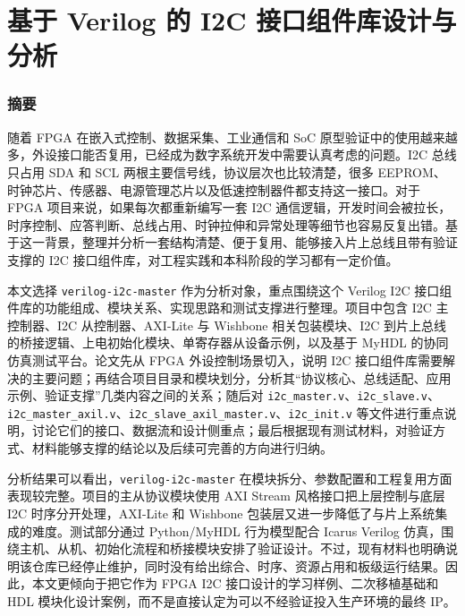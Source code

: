 \section{基于 Verilog 的 I2C 接口组件库设计与分析}\label{ux57faux4e8e-verilog-ux7684-i2c-ux63a5ux53e3ux7ec4ux4ef6ux5e93ux8bbeux8ba1ux4e0eux5206ux6790}

\subsubsection{摘要}\label{ux6458ux8981}

随着 FPGA 在嵌入式控制、数据采集、工业通信和 SoC 原型验证中的使用越来越多，外设接口能否复用，已经成为数字系统开发中需要认真考虑的问题。I2C 总线只占用 SDA 和 SCL 两根主要信号线，协议层次也比较清楚，很多 EEPROM、时钟芯片、传感器、电源管理芯片以及低速控制器件都支持这一接口。对于 FPGA 项目来说，如果每次都重新编写一套 I2C 通信逻辑，开发时间会被拉长，时序控制、应答判断、总线占用、时钟拉伸和异常处理等细节也容易反复出错。基于这一背景，整理并分析一套结构清楚、便于复用、能够接入片上总线且带有验证支撑的 I2C 接口组件库，对工程实践和本科阶段的学习都有一定价值。

本文选择 \texttt{verilog-i2c-master} 作为分析对象，重点围绕这个 Verilog I2C 接口组件库的功能组成、模块关系、实现思路和测试支撑进行整理。项目中包含 I2C 主控制器、I2C 从控制器、AXI-Lite 与 Wishbone 相关包装模块、I2C 到片上总线的桥接逻辑、上电初始化模块、单寄存器从设备示例，以及基于 MyHDL 的协同仿真测试平台。论文先从 FPGA 外设控制场景切入，说明 I2C 接口组件库需要解决的主要问题；再结合项目目录和模块划分，分析其``协议核心、总线适配、应用示例、验证支撑''几类内容之间的关系；随后对 \texttt{i2c\_master.v}、\texttt{i2c\_slave.v}、\texttt{i2c\_master\_axil.v}、\texttt{i2c\_slave\_axil\_master.v}、\texttt{i2c\_init.v} 等文件进行重点说明，讨论它们的接口、数据流和设计侧重点；最后根据现有测试材料，对验证方式、材料能够支撑的结论以及后续可完善的方向进行归纳。

分析结果可以看出，\texttt{verilog-i2c-master} 在模块拆分、参数配置和工程复用方面表现较完整。项目的主从协议模块使用 AXI Stream 风格接口把上层控制与底层 I2C 时序分开处理，AXI-Lite 和 Wishbone 包装层又进一步降低了与片上系统集成的难度。测试部分通过 Python/MyHDL 行为模型配合 Icarus Verilog 仿真，围绕主机、从机、初始化流程和桥接模块安排了验证设计。不过，现有材料也明确说明该仓库已经停止维护，同时没有给出综合、时序、资源占用和板级运行结果。因此，本文更倾向于把它作为 FPGA I2C 接口设计的学习样例、二次移植基础和 HDL 模块化设计案例，而不是直接认定为可以不经验证投入生产环境的最终 IP。

